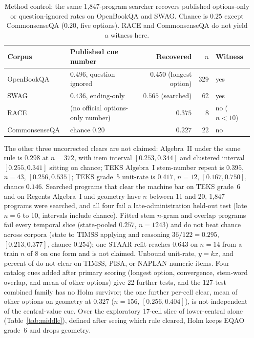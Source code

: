 \begin{table}[t]
  \caption{Method control: the same 1{,}847-program searcher recovers published options-only or question-ignored rates on OpenBookQA and SWAG. Chance is $0.25$ except CommonsenseQA ($0.20$, five options). RACE and CommonsenseQA do not yield a witness here.}
  \label{tab:controls}
  \centering
  \small
  \begin{tabular}{l l r r l}
    \toprule
    Corpus & Published cue number & Recovered & $n$ & Witness \\
    \midrule
    OpenBookQA & $0.496$, question ignored~\cite{mihaylov-etal-2018-suit} & $0.450$ (longest option) & 329 & yes \\
    SWAG & $0.436$, ending-only~\cite{zellers-etal-2018-swag} & $0.565$ (searched) & 62 & yes \\
    RACE~\cite{lai-etal-2017-race} & (no official options-only number) & $0.375$ & 8 & no ($n<10$) \\
    CommonsenseQA~\cite{talmor-etal-2019-commonsenseqa} & chance $0.20$ & $0.227$ & 22 & no \\
    \bottomrule
  \end{tabular}
\end{table}

The other three uncorrected clears are not claimed: Algebra~II under the same rule is $0.298$ at $n=372$, with item interval $[0.253, 0.344]$ and clustered interval $[0.255, 0.341]$ sitting on chance; TEKS Algebra~I stem-number repeat is $0.395$, $n=43$, $[0.256, 0.535]$; TEKS grade~5 unit-rate is $0.417$, $n=12$, $[0.167, 0.750]$, chance $0.146$. Searched programs that clear the machine bar on TEKS grade~6 and on Regents Algebra~I and geometry have $n$ between 11 and 20, 1{,}847 programs were searched, and all four fail a late-administration held-out test (late $n=6$ to $10$, intervals include chance). Fitted stem $n$-gram and overlap programs fail every temporal slice (state-pooled $0.257$, $n=1243$) and do not beat chance across corpora (state to TIMSS applying and reasoning $36/122=0.295$, $[0.213, 0.377]$, chance $0.254$); one STAAR refit reaches $0.643$ on $n=14$ from a train $n$ of 8 on one form and is not claimed. Unbound unit-rate, $y=kx$, and percent-of do not clear on TIMSS, PISA, or NAPLAN numeric items. Four catalog cues added after primary scoring (longest option, convergence, stem-word overlap, and mean of other options) give 22 further tests, and the 127-test combined family has no Holm survivor; the one further per-cell clear, mean of other options on geometry at $0.327$ ($n=156$, $[0.256, 0.404]$), is not independent of the central-value cue. Over the exploratory 17-cell slice of lower-central alone (Table~\ref{tab:middle}), defined after seeing which rule cleared, Holm keeps EQAO grade~6 and drops geometry.

